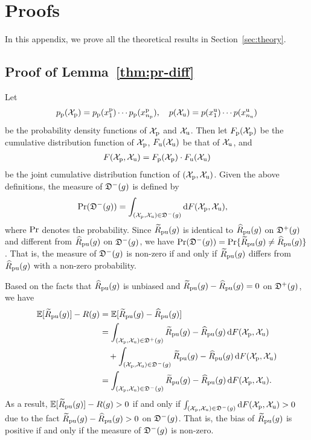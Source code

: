 \section{Proofs}
\label{sec:proof}%

In this appendix, we prove all the theoretical results in Section~\ref{sec:theory}.

\subsection{Proof of Lemma~\ref{thm:pr-diff}}

Let
\begin{align*}
\prp(\Xp)=\prp(\xp_1)\cdots\prp(\xp_\Np),\quad
p(\Xu)=p(\xu_1)\cdots p(\xu_\Nu)
\end{align*}
be the probability density functions of  $\Xp$ and $\Xu$. Then let $F_\mathrm{p}(\Xp)$ be the cumulative distribution function of $\Xp$, $F_\mathrm{u}(\Xu)$ be that of $\Xu$, and
\begin{align*}
F(\Xp,\Xu)=F_\mathrm{p}(\Xp)\cdot F_\mathrm{u}(\Xu)
\end{align*}
be the joint cumulative distribution function of $(\Xp,\Xu)$. Given the above definitions, the measure of $\fD^-(g)$ is defined by
\begin{align*}
\pr(\fD^-(g))
&= \int_{(\Xp,\Xu)\in\fD^-(g)}\dif F(\Xp,\Xu),
\end{align*}
where $\pr$ denotes the probability. Since $\tRpu(g)$ is identical to $\hRpu(g)$ on $\fD^+(g)$ and different from $\hRpu(g)$ on $\fD^-(g)$, we have $\pr(\fD^-(g))=\pr\{\tRpu(g)\neq\hRpu(g)\}$. That is, the measure of $\fD^-(g)$ is non-zero if and only if $\tRpu(g)$ differs from $\hRpu(g)$ with a non-zero probability.

Based on the facts that $\hRpu(g)$ is unbiased and $\tRpu(g)-\hRpu(g)=0$ on $\fD^+(g)$, we have
\begin{align*}
\bE[\tRpu(g)]-R(g)
&= \bE[\tRpu(g)-\hRpu(g)]\\
&= \int_{(\Xp,\Xu)\in\fD^+(g)}\tRpu(g)-\hRpu(g)\,\dif F(\Xp,\Xu)\\
&\quad +\int_{(\Xp,\Xu)\in\fD^-(g)}\tRpu(g)-\hRpu(g)\,\dif F(\Xp,\Xu)\\
&= \int_{(\Xp,\Xu)\in\fD^-(g)}\tRpu(g)-\hRpu(g)\,\dif F(\Xp,\Xu).
\end{align*}
As a result, $\bE[\tRpu(g)]-R(g)>0$ if and only if $\int_{(\Xp,\Xu)\in\fD^-(g)}\dif F(\Xp,\Xu)>0$ due to the fact $\tRpu(g)-\hRpu(g)>0$ on $\fD^-(g)$. That is, the bias of $\tRpu(g)$ is positive if and only if the measure of $\fD^-(g)$ is non-zero.

